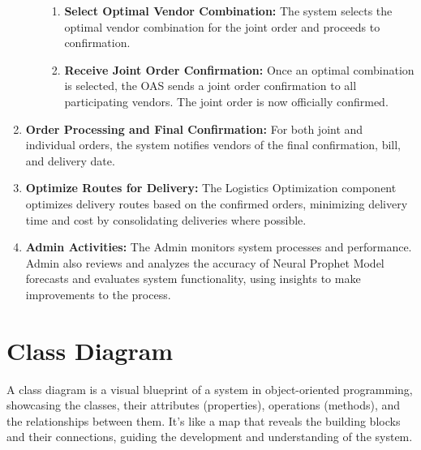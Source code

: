 \begin{enumerate}
\begin{itemize}
\begin{enumerate}
            \item \textbf{Select Optimal Vendor Combination:} The system selects the optimal vendor combination for the joint order and proceeds to confirmation.
            \item \textbf{Receive Joint Order Confirmation:} Once an optimal combination is selected, the OAS sends a joint order confirmation to all participating vendors. The joint order is now officially confirmed.
        \end{enumerate}
    \end{itemize}
    \item \textbf{Order Processing and Final Confirmation:} For both joint and individual orders, the system notifies vendors of the final confirmation, bill, and delivery date.
    \item \textbf{Optimize Routes for Delivery:} The Logistics Optimization component optimizes delivery routes based on the confirmed orders, minimizing delivery time and cost by consolidating deliveries where possible.
    \item \textbf{Admin Activities:} The Admin monitors system processes and performance. Admin also reviews and analyzes the accuracy of Neural Prophet Model forecasts and evaluates system functionality, using insights to make improvements to the process.
\end{enumerate}
\section{Class Diagram}

A class diagram is a visual blueprint of a system in object-oriented programming, showcasing the classes, their attributes (properties), operations (methods), and the relationships between them. It’s like a map that reveals the building blocks and their connections, guiding the development and understanding of the system.

